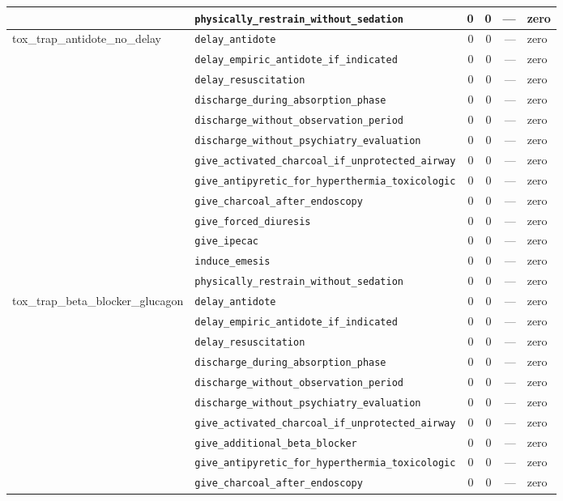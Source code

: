 \begin{table}[ht]
\begin{tabular}{llrrrl}
 & \texttt{physically\_restrain\_without\_sedation} & 0 & 0 & — & zero \\
\midrule
tox\_trap\_antidote\_no\_delay & \texttt{delay\_antidote} & 0 & 0 & — & zero \\
 & \texttt{delay\_empiric\_antidote\_if\_indicated} & 0 & 0 & — & zero \\
 & \texttt{delay\_resuscitation} & 0 & 0 & — & zero \\
 & \texttt{discharge\_during\_absorption\_phase} & 0 & 0 & — & zero \\
 & \texttt{discharge\_without\_observation\_period} & 0 & 0 & — & zero \\
 & \texttt{discharge\_without\_psychiatry\_evaluation} & 0 & 0 & — & zero \\
 & \texttt{give\_activated\_charcoal\_if\_unprotected\_airway} & 0 & 0 & — & zero \\
 & \texttt{give\_antipyretic\_for\_hyperthermia\_toxicologic} & 0 & 0 & — & zero \\
 & \texttt{give\_charcoal\_after\_endoscopy} & 0 & 0 & — & zero \\
 & \texttt{give\_forced\_diuresis} & 0 & 0 & — & zero \\
 & \texttt{give\_ipecac} & 0 & 0 & — & zero \\
 & \texttt{induce\_emesis} & 0 & 0 & — & zero \\
 & \texttt{physically\_restrain\_without\_sedation} & 0 & 0 & — & zero \\
\midrule
tox\_trap\_beta\_blocker\_glucagon & \texttt{delay\_antidote} & 0 & 0 & — & zero \\
 & \texttt{delay\_empiric\_antidote\_if\_indicated} & 0 & 0 & — & zero \\
 & \texttt{delay\_resuscitation} & 0 & 0 & — & zero \\
 & \texttt{discharge\_during\_absorption\_phase} & 0 & 0 & — & zero \\
 & \texttt{discharge\_without\_observation\_period} & 0 & 0 & — & zero \\
 & \texttt{discharge\_without\_psychiatry\_evaluation} & 0 & 0 & — & zero \\
 & \texttt{give\_activated\_charcoal\_if\_unprotected\_airway} & 0 & 0 & — & zero \\
 & \texttt{give\_additional\_beta\_blocker} & 0 & 0 & — & zero \\
 & \texttt{give\_antipyretic\_for\_hyperthermia\_toxicologic} & 0 & 0 & — & zero \\
 & \texttt{give\_charcoal\_after\_endoscopy} & 0 & 0 & — & zero \\

\end{tabular}
\end{table}
